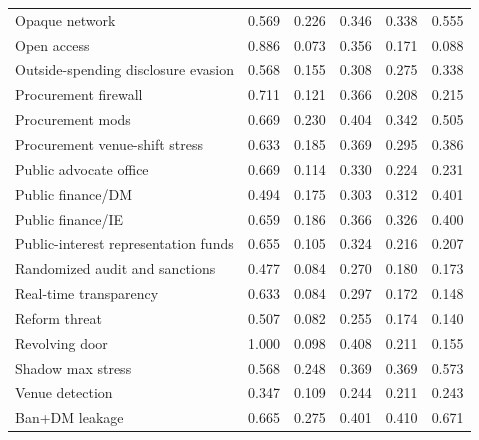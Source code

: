 \begin{longtable}{lrrrrr}
Opaque network & 0.569 & 0.226 & 0.346 & 0.338 & 0.555 \\
Open access & 0.886 & 0.073 & 0.356 & 0.171 & 0.088 \\
Outside-spending disclosure evasion & 0.568 & 0.155 & 0.308 & 0.275 & 0.338 \\
Procurement firewall & 0.711 & 0.121 & 0.366 & 0.208 & 0.215 \\
Procurement mods & 0.669 & 0.230 & 0.404 & 0.342 & 0.505 \\
Procurement venue-shift stress & 0.633 & 0.185 & 0.369 & 0.295 & 0.386 \\
Public advocate office & 0.669 & 0.114 & 0.330 & 0.224 & 0.231 \\
Public finance/DM & 0.494 & 0.175 & 0.303 & 0.312 & 0.401 \\
Public finance/IE & 0.659 & 0.186 & 0.366 & 0.326 & 0.400 \\
Public-interest representation funds & 0.655 & 0.105 & 0.324 & 0.216 & 0.207 \\
Randomized audit and sanctions & 0.477 & 0.084 & 0.270 & 0.180 & 0.173 \\
Real-time transparency & 0.633 & 0.084 & 0.297 & 0.172 & 0.148 \\
Reform threat & 0.507 & 0.082 & 0.255 & 0.174 & 0.140 \\
Revolving door & 1.000 & 0.098 & 0.408 & 0.211 & 0.155 \\
Shadow max stress & 0.568 & 0.248 & 0.369 & 0.369 & 0.573 \\
Venue detection & 0.347 & 0.109 & 0.244 & 0.211 & 0.243 \\
Ban+DM leakage & 0.665 & 0.275 & 0.401 & 0.410 & 0.671 \\
\bottomrule
\end{longtable}
\endgroup
